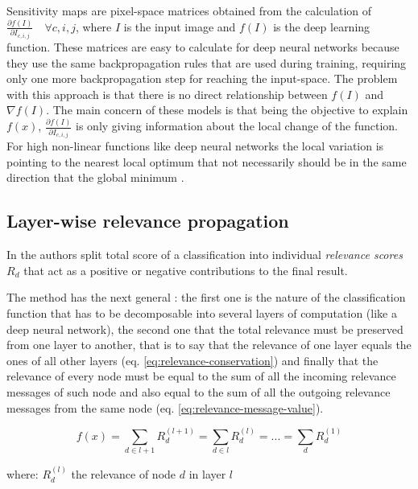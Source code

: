 \documentclass[preprint]{elsarticle}
\theoremstyle{definition} %
\theoremstyle{remark}
\begin{document}
Sensitivity maps \cite{DBLP:journals/corr/SimonyanVZ13} are pixel-space matrices obtained from the calculation of $ \frac{\partial f(I)}{\partial I_{c,i,j}} \quad \forall c,i,j$, where $I$ is the input image and $f(I)$ is the deep learning function. These matrices are easy to calculate for deep neural networks because they use the same backpropagation rules that are used during training, requiring only one more backpropagation step for reaching the input-space. The problem with this approach is that there is no direct relationship between $f(I)$ and $\nabla f(I)$. The main concern of these models is that being the objective to explain $f(x)$, $ \frac{\partial f(I)}{\partial I_{c,i,j}}$ is only giving information about the local change of the function. For high non-linear functions like deep neural networks the local variation is pointing to the nearest local optimum that not necessarily should be in the same direction that the global minimum \cite{baehrens2010explain}.


\subsection{Layer-wise relevance propagation} 

In \cite{bach2015pixel} the authors split total score of a classification into individual \emph{relevance scores} $R_d$ that act as a positive or negative contributions to the final result. 

The method has the next general : the first one is the nature of the classification function that has to be decomposable into several layers of computation (like a deep neural network), the second one that the total relevance must be preserved from one layer to another, that is to say that the relevance of one layer equals the ones of all other layers (eq. \ref{eq:relevance-conservation}) and finally that the relevance of every node must be equal to the sum of all the incoming relevance messages of such node and also equal to the sum of all the outgoing relevance messages from the same node (eq. \ref{eq:relevance-message-value}).

\begin{equation}
	f(x) = \sum_{d \in l+1}R_d^{(l+1)} = \sum_{d \in l}R_d^{(l)} = ... = \sum_{d}R_d^{(1)}
	\label{eq:relevance-conservation}
\end{equation}

where: $R_d^{(l)}$ the relevance of node $d$ in layer $l$
\end{document}
